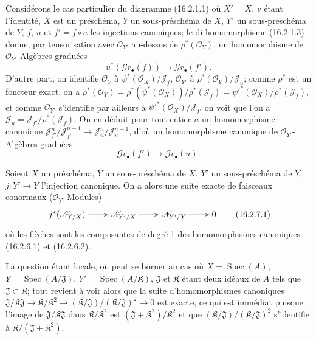 \begin{env}[16.2.6]
\label{IV.16.2.6}
Considérons le cas particulier du diagramme (16.2.1.1) où $X'=X$, $v$ étant
l'identité, $X$ est un préschéma, $Y$ un sous-préschéma de $X$, $Y'$ un
sous-préschéma de $Y$, $f$, $u$ et $f'=f\circ u$ les injections canoniques; le
di-homomorphisme (16.2.1.3) donne, par tensorisation avec
$\mathcal{O}_{Y'}$ au-dessus de $\rho^*(\mathcal{O}_Y)$, un homomorphisme de
$\mathcal{O}_{Y'}$-Algèbres graduées
\[
  u^*(\mathscr{G}r_\bullet(f))
  \longrightarrow\mathscr{G}r_\bullet(f').
  \tag{16.2.6.1}
  \label{IV.16.2.6.1}
\]
D'autre part, on identifie $\mathcal{O}_Y$ à
$\psi^*(\mathcal{O}_X)/\mathscr{J}_f$, $\mathcal{O}_{Y'}$ à
$\rho^*(\mathcal{O}_Y)/\mathscr{J}_u$; comme $\rho^*$ est un foncteur exact,
on a
$\rho^*(\mathcal{O}_Y)=
\rho^*(\psi^*(\mathcal{O}_X))/\rho^*(\mathscr{J}_f)=
\psi'^*(\mathcal{O}_X)/\rho^*(\mathscr{J}_f)$, et comme
$\mathcal{O}_{Y'}$ s'identifie par ailleurs à
$\psi'^*(\mathcal{O}_X)/\mathscr{J}_{f'}$ on voit que l'on a
$\mathscr{J}_u=\mathscr{J}_{f'}/\rho^*(\mathscr{J}_f)$. On en déduit pour
tout entier $n$ un homomorphisme canonique
$\mathscr{J}_{f'}^n/\mathscr{J}_{f'}^{n+1}\to
\mathscr{J}_u^n/\mathscr{J}_u^{n+1}$, d'où un homomorphisme canonique de
$\mathcal{O}_{Y'}$-Algèbres graduées
\[
  \mathscr{G}r_\bullet(f')
  \longrightarrow\mathscr{G}r_\bullet(u).
  \tag{16.2.6.2}
  \label{IV.16.2.6.2}
\]
\end{env}

\begin{proposition}[16.2.7]
\label{IV.16.2.7}
Soient $X$ un préschéma, $Y$ un sous-préschéma de $X$, $Y'$ un
sous-préschéma de $Y$, $j:Y'\to Y$ l'injection canonique. On a alors une suite
exacte de faisceaux conormaux ($\mathcal{O}_{Y'}$-Modules)
\[
  \xymatrix{
    j^*(\mathscr{N}_{Y/X}) \ar[r] &
    \mathscr{N}_{Y'/X} \ar[r] &
    \mathscr{N}_{Y'/Y} \ar[r] & 0
  }
  \tag{16.2.7.1}
  \label{IV.16.2.7.1}
\]
où les flèches sont les composantes de degré 1 des homomorphismes canoniques
\textup{(16.2.6.1)} et \textup{(16.2.6.2)}.
\end{proposition}

La question étant locale, on peut se borner au cas où
$X=\operatorname{Spec}(A)$, $Y=\operatorname{Spec}(A/\mathfrak{J})$,
$Y'=\operatorname{Spec}(A/\mathfrak{K})$, $\mathfrak{J}$ et $\mathfrak{K}$
étant deux idéaux de $A$ tels que $\mathfrak{J}\subset\mathfrak{K}$; tout
revient à voir alors
que la suite d'homomorphismes canoniques
$\mathfrak{J}/\mathfrak{K}\mathfrak{J}\to
\mathfrak{K}/\mathfrak{K}^2\to
(\mathfrak{K}/\mathfrak{J})/(\mathfrak{K}/\mathfrak{J})^2\to 0$
est exacte, ce qui est immédiat puisque l'image de
$\mathfrak{J}/\mathfrak{K}\mathfrak{J}$ dans
$\mathfrak{K}/\mathfrak{K}^2$ est
$(\mathfrak{J}+\mathfrak{K}^2)/\mathfrak{K}^2$ et que
$(\mathfrak{K}/\mathfrak{J})/(\mathfrak{K}/\mathfrak{J})^2$ s'identifie à
$\mathfrak{K}/(\mathfrak{J}+\mathfrak{K}^2)$.

